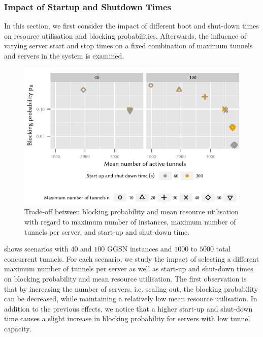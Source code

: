 \subsubsection*{Impact of Startup and Shutdown Times}\label{sec:cloud_virtualized_network_functions:startup_shutdown}

In this section, we first consider the impact of different boot and shut-down times on resource utilisation and blocking probabilities.
Afterwards, the influence of varying server start and stop times on a fixed combination of maximum tunnels and servers in the system is examined.

\begin{figure}
  \centering
  \includegraphics{cloud/virtualized_network_functions/performance_evaluation/figures/compare_util_block}
  \caption{Trade-off between blocking probability and mean resource utilisation with regard to maximum number of instances, maximum number of tunnels per server, and start-up and shut-down time.}
  \label{fig:cloud_virtualized_network_functions:startup_shutdown:compare_util_block}
\end{figure}

 shows scenarios with \(40\) and \(100\) \gls{GGSN} instances and  \(1000\) to \(5000\) total concurrent tunnels.
For each scenario, we study the impact of selecting a different maximum number of tunnels per server as well as start-up and shut-down times on blocking probability and mean resource utilisation.
The first observation is that by increasing the number of servers, i.e. scaling out, the blocking probability can be decreased, while maintaining a relatively low mean resource utilisation.
In addition to the previous effects, we notice that a higher start-up and shut-down time causes a slight increase in blocking probability for servers with low tunnel capacity.

